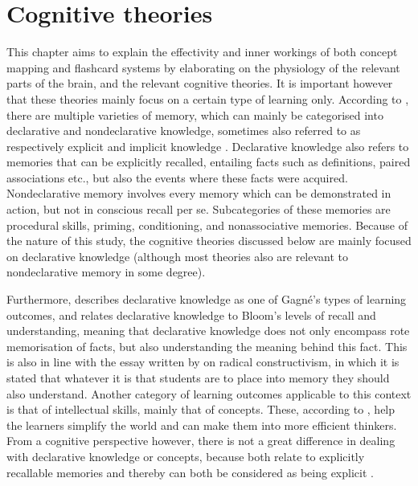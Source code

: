 \chapter{Cognitive theories}



This chapter aims to explain the effectivity and inner workings of both concept mapping and flashcard systems by elaborating on the physiology of the relevant parts of the brain, and the relevant cognitive theories. It is important however that these theories mainly focus on a certain type of learning only. According to , there are multiple varieties of memory, which can mainly be categorised into declarative and nondeclarative knowledge, sometimes also referred to as respectively explicit and implicit knowledge . Declarative knowledge also refers to memories that can be explicitly recalled, entailing facts such as definitions, paired associations etc., but also the events where these facts were acquired. Nondeclarative memory involves every memory which can be demonstrated in action, but not in conscious recall per se. Subcategories of these memories are procedural skills, priming, conditioning, and nonassociative memories. Because of the nature of this study, the cognitive theories discussed below are mainly focused on declarative knowledge (although most theories also are relevant to nondeclarative memory in some degree).

Furthermore,  describes declarative knowledge as one of Gagné's types of learning outcomes, and relates declarative knowledge to Bloom's levels of recall and understanding, meaning that declarative knowledge does not only encompass rote memorisation of facts, but also understanding the meaning behind this fact. This is also in line with the essay written by  on radical constructivism, in which it is stated that whatever it is that students are to place into memory they should also understand. Another category of learning outcomes applicable to this context is that of intellectual skills, mainly that of concepts. These, according to , help the learners simplify the world and can make them into more efficient thinkers. From a cognitive perspective however, there is not a great difference in dealing with declarative knowledge or concepts, because both relate to explicitly recallable memories and thereby can both be considered as being explicit \cite{squire}.

